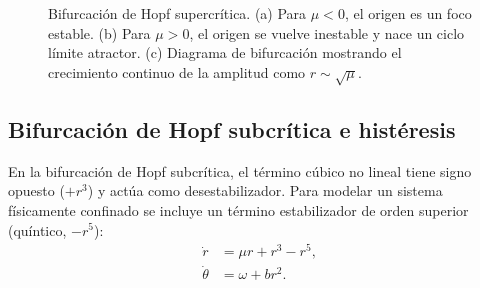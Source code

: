 \begin{figure}[htbp]
\caption{Bifurcación de Hopf supercrítica. (a) Para $\mu < 0$, el origen es un foco estable. (b) Para $\mu > 0$, el origen se vuelve inestable y nace un ciclo límite atractor. (c) Diagrama de bifurcación mostrando el crecimiento continuo de la amplitud como $r \sim \sqrt{\mu}$.}
\label{fig:hopf_supercritica}
\end{figure}

\subsection{Bifurcación de Hopf subcrítica e histéresis}

En la bifurcación de Hopf subcrítica, el término cúbico no lineal tiene signo opuesto ($+r^3$) y actúa como desestabilizador. Para modelar un sistema físicamente confinado se incluye un término estabilizador de orden superior (quíntico, $-r^5$):
\begin{align}
    \dot{r} &= \mu r + r^3 - r^5, \label{eq:hopf_sub_r} \\
    \dot{\theta} &= \omega + b r^2. \label{eq:hopf_sub_theta}
\end{align}

